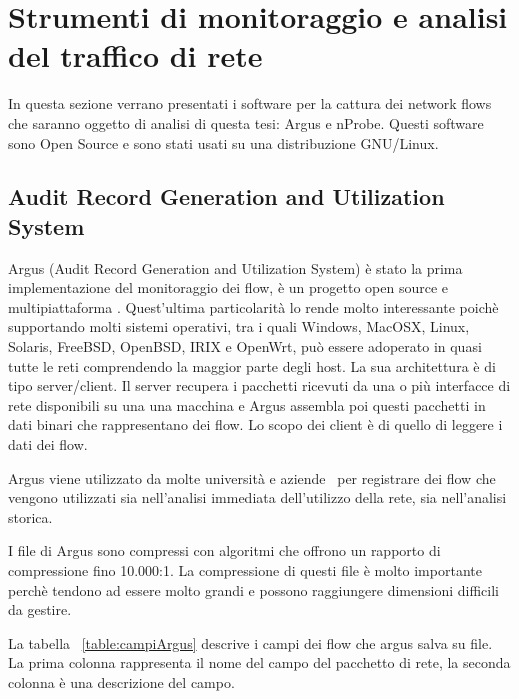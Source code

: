\documentclass[../main.tex]{subfiles}
\begin{document}
\section{Strumenti di monitoraggio e analisi del traffico di rete}
In questa sezione verrano presentati i software per la cattura dei network flows che saranno oggetto di analisi di questa tesi: Argus e nProbe. Questi software sono Open Source e sono stati usati su una distribuzione GNU/Linux.

\subsection{Audit Record Generation and Utilization System}
Argus (Audit Record Generation and Utilization System) è stato la prima implementazione del monitoraggio dei flow, è un progetto open source e multipiattaforma \cite{Argus}.
Quest'ultima particolarità lo rende molto interessante poichè supportando molti sistemi operativi, tra i quali Windows, MacOSX, Linux, Solaris, FreeBSD, OpenBSD, IRIX e OpenWrt, può essere adoperato in quasi tutte le reti comprendendo la maggior parte degli host. La sua architettura è di tipo server/client. Il server recupera i pacchetti ricevuti da una o più interfacce di rete disponibili su una una macchina e Argus assembla poi questi pacchetti in dati binari che rappresentano dei flow. Lo scopo dei client è di quello di leggere i dati dei flow. 

Argus viene utilizzato da molte università e aziende~\cite{argusdef} per registrare dei flow che vengono utilizzati sia nell'analisi immediata dell'utilizzo della rete, sia nell'analisi storica.

I file di Argus sono compressi con algoritmi che offrono un rapporto di compressione fino 10.000:1. La compressione di questi file è molto importante perchè tendono ad essere molto grandi e possono raggiungere dimensioni difficili da gestire.


La tabella ~\ref{table:campiArgus} descrive i campi dei flow che argus salva su file. La prima colonna rappresenta il nome del campo del pacchetto di rete, la seconda colonna è una descrizione del campo.
\end{document}

